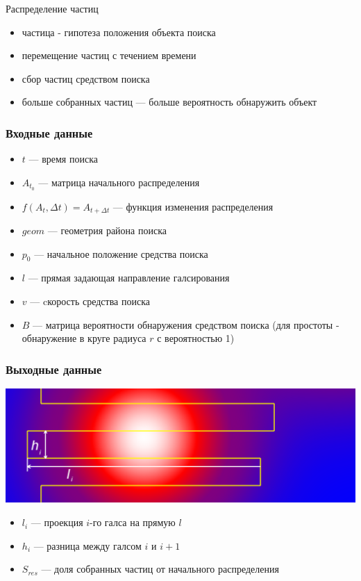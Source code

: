 \documentclass{beamer} %
\theoremstyle{definition} %
\begin{document}
\begin{frame}[t]
{
Распределение частиц\\
\pause
\begin{itemize}
  \pause
\item частица - гипотеза положения объекта поиска
  \pause
\item перемещение частиц с течением времени
  \pause
\item сбор частиц средством поиска
  \pause
\item больше собранных частиц --- больше вероятность обнаружить объект
\end{itemize}
}
\end{frame}

\begin{frame}
  \frametitle{Входные данные}
\begin{itemize}
\item $t$ --- время поиска
\item $A_{t_0}$ --- матрица начального распределения
\item $f(A_t, \Delta t) = A_{t+\Delta t}$ --- функция изменения распределения
\item $geom$ --- геометрия района поиска
\item $p_0$ --- начальное положение средства поиска
\item $l$ --- прямая задающая направление галсирования
\item $v$ --- cкорость средства поиска
\item $B$ --- матрица вероятности обнаружения средством поиска (для простоты - обнаружение в круге радиуса $r$ с вероятностью 1)
\end{itemize}
\end{frame}

\begin{frame}
  \frametitle{Выходные данные}
\includegraphics[width=\textwidth]{pics/pic06-lh.png}
\begin{itemize}
  \item $l_i$ --- проекция $i$-го галса на прямую $l$
  \item $h_i$ --- разница между галсом $i$ и $i+1$
  \item $S_{res}$ --- доля собранных частиц от начального распределения
\end{itemize}

\end{frame}
\end{document}
